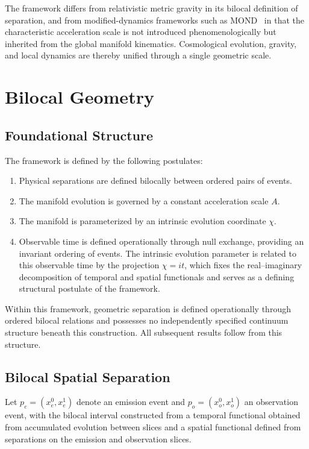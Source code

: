\documentclass[fontsize=12pt, paper=a4]{scrartcl}
\begin{document}
The framework differs from relativistic metric gravity in its bilocal definition of separation, and from modified-dynamics frameworks such as MOND~\cite{Milgrom1983,McGaugh2016} in that the characteristic acceleration scale is not introduced phenomenologically but inherited from the global manifold kinematics. Cosmological evolution, gravity, and local dynamics are thereby unified through a single geometric scale.

\section{Bilocal Geometry}

\subsection{Foundational Structure}

The framework is defined by the following postulates:

\begin{enumerate}
\item Physical separations are defined bilocally between ordered pairs of events.
\item The manifold evolution is governed by a constant acceleration scale $A$.
\item The manifold is parameterized by an intrinsic evolution coordinate $\chi$.
\item Observable time is defined operationally through null exchange, providing an invariant ordering of events. The intrinsic evolution parameter is related to this observable time by the projection $\chi = i t$, which fixes the real--imaginary decomposition of temporal and spatial functionals and serves as a defining structural postulate of the framework.
\end{enumerate}

Within this framework, geometric separation is defined operationally through ordered bilocal relations and possesses no independently specified continuum structure beneath this construction.  All subsequent results follow from this structure.

\subsection{Bilocal Spatial Separation}

Let $p_e=(x_e^0,x_e^1)$ denote an emission event and $p_o=(x_o^0,x_o^1)$ an observation event, with the bilocal interval constructed from a temporal functional obtained from accumulated evolution between slices and a spatial functional defined from separations on the emission and observation slices.
\end{document}
